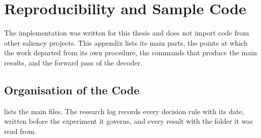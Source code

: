 \chapter{Reproducibility and Sample Code}\label{app:code}

The implementation was written for this thesis and does not import code from
other saliency projects. This appendix lists its main parts, the points at
which the work departed from its own procedure, the commands that produce the
main results, and the forward pass of the decoder.

\section{Organisation of the Code}

 lists the main files. The research log records every decision
rule with its date, written before the experiment it governs, and every
result with the folder it was read from.

